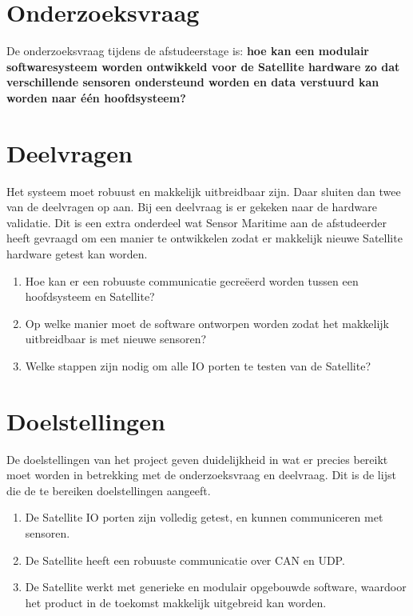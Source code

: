 \section{Onderzoeksvraag}
De onderzoeksvraag tijdens de afstudeerstage is: \textbf{hoe kan een modulair softwaresysteem worden ontwikkeld voor de Satellite hardware zo dat verschillende sensoren ondersteund worden en data verstuurd kan worden naar één hoofdsysteem?}

\section{Deelvragen}
Het systeem moet robuust en makkelijk uitbreidbaar zijn. Daar sluiten dan twee van de deelvragen op aan. Bij een deelvraag is er gekeken naar de hardware validatie. Dit is een extra onderdeel wat Sensor Maritime aan de afstudeerder heeft gevraagd om een manier te ontwikkelen zodat er makkelijk nieuwe Satellite hardware getest kan worden.
\begin{enumerate}
	\item Hoe kan er een robuuste  communicatie gecreëerd worden tussen een hoofdsysteem en Satellite?
	\item Op welke manier moet de software ontworpen worden zodat het makkelijk uitbreidbaar is met nieuwe sensoren?
	\item Welke stappen zijn nodig om alle IO porten te testen van de Satellite?
\end{enumerate}

\section{Doelstellingen}
De doelstellingen van het project geven duidelijkheid in wat er precies bereikt moet worden in betrekking met de onderzoeksvraag en deelvraag. Dit is de lijst die de te bereiken doelstellingen aangeeft.
\begin{enumerate}
	\item De Satellite IO porten zijn volledig getest, en kunnen communiceren met sensoren.
	\item De Satellite heeft een robuuste communicatie over CAN en UDP. 
	\item De Satellite werkt met generieke en modulair opgebouwde software, waardoor het product in de toekomst makkelijk uitgebreid kan worden.
\end{enumerate}

\newpage
